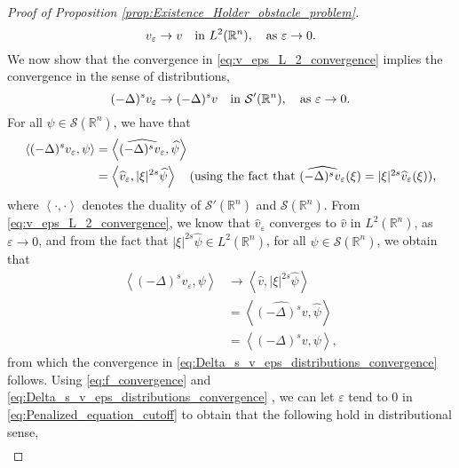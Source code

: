 \documentclass[11pt,reqno]{amsart}
\theoremstyle{definition}
\theoremstyle{remark}
\begin{document}
\begin{proof}[Proof of Proposition \ref{prop:Existence_Holder_obstacle_problem}]
\begin{equation}
\label{eq:v_eps_L_2_convergence}
v_{\varepsilon}\rightarrow v\quad\hbox{in } L^2({\mathbb{R}}^n),\quad\hbox{as } {\varepsilon}\rightarrow 0.
\end{equation}
We now show that the convergence in  \eqref{eq:v_eps_L_2_convergence} implies the convergence in the sense of distributions,
\begin{equation}
\label{eq:Delta_s_v_eps_distributions_convergence}
(-\Delta)^s v_{\varepsilon} \rightarrow (-\Delta)^s v \quad\hbox{in } {{\mathcal{S}}}'({\mathbb{R}}^n),\quad\hbox{as } {\varepsilon}\rightarrow 0.
\end{equation}
For all $\psi\in{{\mathcal{S}}}({\mathbb{R}}^n)$, we have that
\begin{align*}
\left\langle (-\Delta)^s v_{\varepsilon}, \psi \right\rangle &= \left\langle \widehat{(-\Delta)^s v_{\varepsilon}}, \widehat \psi \right\rangle\\
&=\left\langle  \widehat v_{\varepsilon}, |\xi|^{2s}\widehat \psi \right\rangle\quad\hbox{(using the fact that $\widehat{(-\Delta)^s v_{\varepsilon}}(\xi)=|\xi|^{2s}\widehat v_{\varepsilon}(\xi)$)},
\end{align*}
where $\left\langle\cdot,\cdot\right\rangle$ denotes the duality of ${{\mathcal{S}}}'({\mathbb{R}}^n)$ and ${{\mathcal{S}}}({\mathbb{R}}^n)$. From \eqref{eq:v_eps_L_2_convergence}, we know that $\widehat v_{\varepsilon}$ converges to $\widehat v$ in $L^2({\mathbb{R}}^n)$, as ${\varepsilon}\rightarrow 0$, and from the fact that $|\xi|^{2s}\widehat \psi\in L^2({\mathbb{R}}^n)$, for all $\psi\in{{\mathcal{S}}}({\mathbb{R}}^n)$, we obtain that
\begin{align*}
\left\langle (-\Delta)^s v_{\varepsilon}, \psi \right\rangle 
&\rightarrow \left\langle  \widehat v, |\xi|^{2s}\widehat \psi \right\rangle\\
&= \left\langle \widehat{(-\Delta)^s v}, \widehat \psi \right\rangle\\
&= \left\langle (-\Delta)^s v, \psi \right\rangle, 
\end{align*}
from which the convergence in \eqref{eq:Delta_s_v_eps_distributions_convergence} follows. Using \eqref{eq:f_convergence} and \eqref{eq:Delta_s_v_eps_distributions_convergence} , we can let ${\varepsilon}$ tend to $0$ in \eqref{eq:Penalized_equation_cutoff} to obtain that the following hold in distributional sense,
\begin{equation}
\label{eq:Obstacle_problem_cutoff}
\begin{aligned}

\end{aligned}
\end{equation}
\end{proof}
\end{document}
